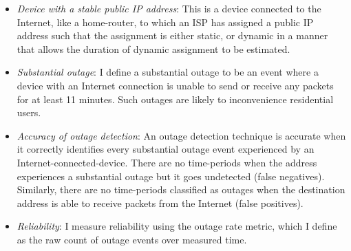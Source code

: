 \begin{itemize}

\item {\emph{Device with a stable public IP address}: This is a device
    connected to the Internet, like a
home-router, to which an ISP has assigned a public IP address such
that the
assignment is either static, or dynamic in a manner that allows the
duration of dynamic assignment to be estimated.}

\item {\emph{Substantial outage}: I define a substantial outage to be an event where a device
    with an Internet connection is unable to send or receive any
    packets for at least 11 minutes. Such outages are likely to inconvenience residential users.}

\item {\emph{Accuracy of outage detection}: An outage detection technique is accurate when it
correctly identifies every substantial outage event experienced by an Internet-connected-device. There are no time-periods when the address
experiences a substantial outage but it goes undetected (false
negatives). Similarly, there are no time-periods classified as
outages when the destination address is able to receive packets from the
Internet (false positives).}

\item {\emph{Reliability}: I measure reliability using the outage
    rate metric, which I define as the raw count of outage
events over measured time.}

\end{itemize}







